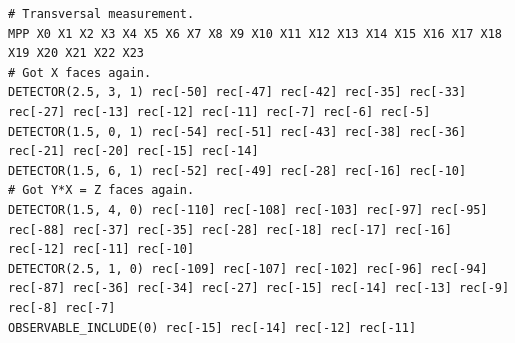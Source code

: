 \documentclass[onecolumn,unpublished,a4paper]{quantumarticle}
\theoremstyle{definition}
\theoremstyle{definition}
\theoremstyle{definition}
\begin{document}
\begin{lstlisting}[style=stimcircuit]
# Transversal measurement.
MPP X0 X1 X2 X3 X4 X5 X6 X7 X8 X9 X10 X11 X12 X13 X14 X15 X16 X17 X18 X19 X20 X21 X22 X23
# Got X faces again.
DETECTOR(2.5, 3, 1) rec[-50] rec[-47] rec[-42] rec[-35] rec[-33] rec[-27] rec[-13] rec[-12] rec[-11] rec[-7] rec[-6] rec[-5]
DETECTOR(1.5, 0, 1) rec[-54] rec[-51] rec[-43] rec[-38] rec[-36] rec[-21] rec[-20] rec[-15] rec[-14]
DETECTOR(1.5, 6, 1) rec[-52] rec[-49] rec[-28] rec[-16] rec[-10]
# Got Y*X = Z faces again.
DETECTOR(1.5, 4, 0) rec[-110] rec[-108] rec[-103] rec[-97] rec[-95] rec[-88] rec[-37] rec[-35] rec[-28] rec[-18] rec[-17] rec[-16] rec[-12] rec[-11] rec[-10]
DETECTOR(2.5, 1, 0) rec[-109] rec[-107] rec[-102] rec[-96] rec[-94] rec[-87] rec[-36] rec[-34] rec[-27] rec[-15] rec[-14] rec[-13] rec[-9] rec[-8] rec[-7]
OBSERVABLE_INCLUDE(0) rec[-15] rec[-14] rec[-12] rec[-11]
\end{lstlisting}
\end{document}
